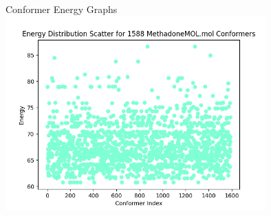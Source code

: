 \documentclass{beamer}
\begin{document}
\begin{frame}{Conformer Energy Graphs}
\includegraphics[width=10cm]{img/Graphs/MethadoneMOL_Energy_Scatter.png}
\end{frame}
\end{document}
